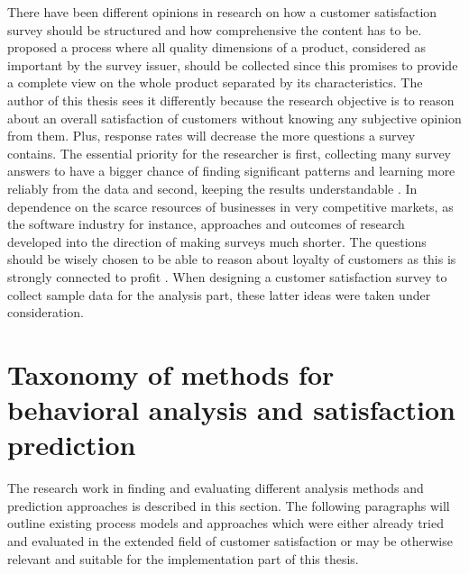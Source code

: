 There have been different opinions in research on how a customer satisfaction survey should be structured and how comprehensive the content has to be. \cite{hayes1998measuring} proposed a process where all quality dimensions of a product, considered as important by the survey issuer, should be collected since this promises to provide a complete view on the whole product separated by its characteristics. The author of this thesis sees it differently because the research objective is to reason about an overall satisfaction of customers without knowing any subjective opinion from them. Plus, response rates will decrease the more questions a survey contains. The essential priority for the researcher is first, collecting many survey answers to have a bigger chance of finding significant patterns and learning more reliably from the data and second, keeping the results understandable \cite{sauermann2013increasing}. In dependence on the scarce resources of businesses in very competitive markets, as the software industry for instance, approaches and outcomes of research developed into the direction of making surveys much shorter. The questions should be wisely chosen to be able to reason about loyalty of customers as this is strongly connected to profit \cite{reichheld2003one}. When designing a customer satisfaction survey to collect sample data for the analysis part, these latter ideas were taken under consideration. 

\section{Taxonomy of methods for behavioral analysis and satisfaction prediction}
The research work in finding and evaluating different analysis methods and prediction approaches is described in this section. The following paragraphs will outline existing process models and approaches which were either already tried and evaluated in the extended field of customer satisfaction or may be otherwise relevant and suitable for the implementation part of this thesis. 

